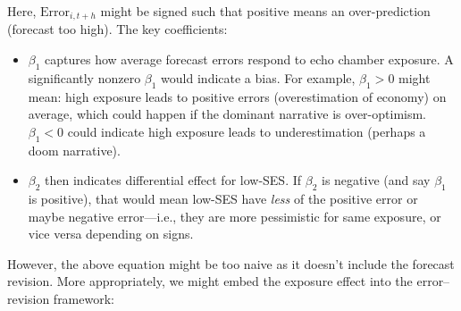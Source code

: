\documentclass[12pt]{article}
\begin{document}
Here, $\text{Error}_{i,t+h}$ might be signed such that positive means an over-prediction (forecast too high). The key coefficients:

\begin{itemize}
    \item $\beta_1$ captures how average forecast errors respond to echo chamber exposure. A significantly nonzero $\beta_1$ would indicate a bias. For example, $\beta_1 > 0$ might mean: high exposure leads to positive errors (overestimation of economy) on average, which could happen if the dominant narrative is over-optimism. $\beta_1 < 0$ could indicate high exposure leads to underestimation (perhaps a doom narrative).
    \item $\beta_2$ then indicates differential effect for low-SES. If $\beta_2$ is negative (and say $\beta_1$ is positive), that would mean low-SES have \emph{less} of the positive error or maybe negative error—i.e., they are more pessimistic for same exposure, or vice versa depending on signs.

\end{itemize}
However, the above equation might be too naive as it doesn't include the forecast revision. More appropriately, we might embed the exposure effect into the error–revision framework:
\end{document}
